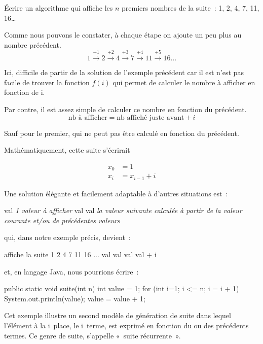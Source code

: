 		Écrire un algorithme qui affiche les $n$ premiers nombres de la suite~:
		1, 2, 4, 7, 11, 16\dots{}
		
		Comme nous pouvons le constater, 
		à chaque étape on ajoute un peu plus au nombre précédent.
		\[ 
			1 
			\xrightarrow{+1} 2 
			\xrightarrow{+2} 4
			\xrightarrow{+3} 7 
			\xrightarrow{+4} 11 
			\xrightarrow{+5} 16 
			\dots
		\] 

		Ici, difficile de partir de la solution de l’exemple précédent car il
		est n’est pas facile de trouver la fonction $f(i)$ qui permet de
		calculer le nombre à afficher en fonction de i. 
		
		Par contre, il est assez simple de calculer ce nombre 
		en fonction du précédent.
		\[
			\mbox{nb à afficher} = \mbox{nb affiché juste avant} + i
		\]
		
		Sauf pour le premier, qui ne peut pas être calculé en fonction du
		précédent.

		\clearpage	
		Mathématiquement, cette suite s'écrirait

		\begin{align*}
			x_0 &= 1\\
			x_i &= x_{i-1} + i
		\end{align*}


		Une solution élégante et facilement adaptable à d’autres situations
		est~:
		
		\begin{pseudocode}
				\Let val \Gets \textit{1\iere{} valeur à afficher}
					\Write val
					\Let val \Gets \textit{la valeur suivante calculée à partir de}
					\Let\Indent \textit{la valeur courante et/ou de précédentes valeurs}
				\EndFor
			\EndAlgo
		\end{pseudocode}
		
		qui, dans notre exemple précis, devient~:

		\begin{pseudocode}
			\LComment affiche la suite 1 2 4 7 11 16 ...
			\Algo{suite}{\Par{n}{integer}}{}
				\Decl{val}{integer}
				\Let val \Gets 1
				\For{i}{1}{n}
					\Write val
					\Let val \Gets val + i
				\EndFor
			\EndAlgo
		\end{pseudocode}

		et, en langage Java, nous pourrions écrire~:

		\begin{java}
public static void suite(int n){
	int value = 1;
	for (int i=1; i <= n; i = i + 1){
		System.out.println(value);
		value = value + 1;
	}
}
		\end{java}

		Cet exemple illustre un second modèle de génération de suite dans lequel
		l'élément à la i\ieme\ place, le i\ieme\ terme, est exprimé en fonction
		du ou des précédents termes. Ce genre de suite, s'appelle  «~suite
		récurrente~». 
                     
